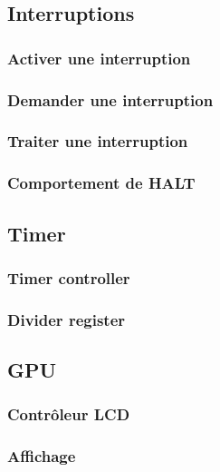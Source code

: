 \documentclass[a4paper]{article}
\begin{document}
\subsection{Interruptions}
\subsubsection{Activer une interruption}

\subsubsection{Demander une interruption}

\subsubsection{Traiter une interruption}

\subsubsection{Comportement de HALT}


\subsection{Timer}
\subsubsection{Timer controller}

\subsubsection{Divider register}



\subsection{GPU}
\subsubsection{Contrôleur LCD}

\subsubsection{Affichage}
\end{document}
